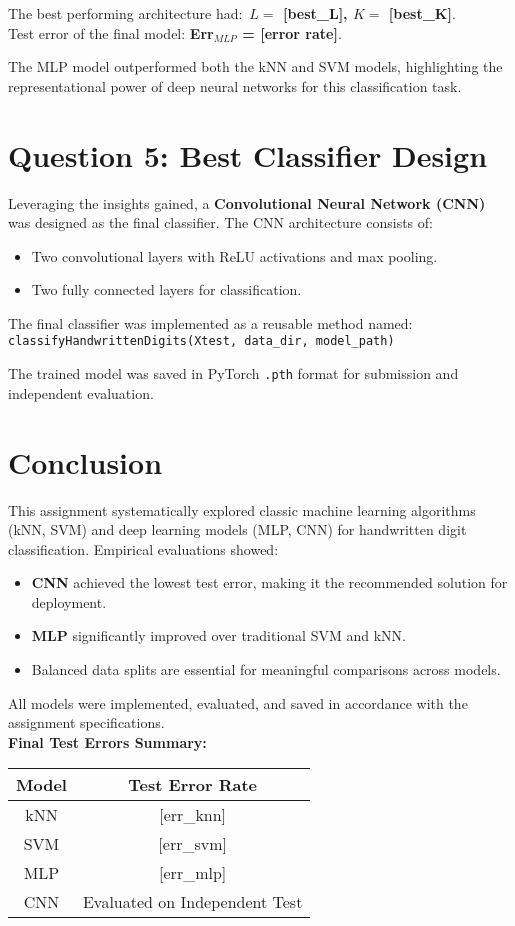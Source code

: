 \documentclass[12pt]{article}
\begin{document}
The best performing architecture had:\
\textbf{$L = $ [best\_L], $K = $ [best\_K]}.\\
Test error of the final model: \textbf{Err$_{MLP}$ = [error rate]}.

The MLP model outperformed both the kNN and SVM models, highlighting the representational power of deep neural networks for this classification task.

\section*{Question 5: Best Classifier Design}
Leveraging the insights gained, a \textbf{Convolutional Neural Network (CNN)} was designed as the final classifier. The CNN architecture consists of:

\begin{itemize}
    \item Two convolutional layers with ReLU activations and max pooling.
    \item Two fully connected layers for classification.
\end{itemize}

The final classifier was implemented as a reusable method named:\\
\texttt{classifyHandwrittenDigits(Xtest, data\_dir, model\_path)}

The trained model was saved in PyTorch \texttt{.pth} format for submission and independent evaluation.

\section*{Conclusion}
This assignment systematically explored classic machine learning algorithms (kNN, SVM) and deep learning models (MLP, CNN) for handwritten digit classification. Empirical evaluations showed:

\begin{itemize}
    \item \textbf{CNN} achieved the lowest test error, making it the recommended solution for deployment.
    \item \textbf{MLP} significantly improved over traditional SVM and kNN.
    \item Balanced data splits are essential for meaningful comparisons across models.
\end{itemize}

All models were implemented, evaluated, and saved in accordance with the assignment specifications.\\
\textbf{Final Test Errors Summary:}
\begin{center}
\begin{tabular}{|c|c|}
\hline
Model & Test Error Rate \\
\hline
kNN & [err\_knn] \\
SVM & [err\_svm] \\
MLP & [err\_mlp] \\
CNN & Evaluated on Independent Test \\
\hline
\end{tabular}
\end{center}
\end{document}
